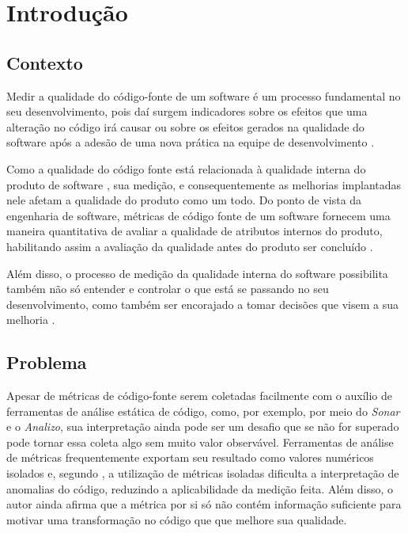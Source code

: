 \chapter{Introdução}

\section{Contexto}

Medir a qualidade do código-fonte  de um software é um processo fundamental no seu desenvolvimento, pois daí surgem indicadores sobre os efeitos que uma alteração no código irá causar ou sobre os efeitos gerados na qualidade do software após a adesão de uma nova prática na equipe de desenvolvimento \cite{Fenton98}. 

Como a qualidade do código fonte está relacionada à qualidade interna do produto de software \cite{ISO25023}, sua medição, e consequentemente as melhorias implantadas nele afetam a qualidade do produto como um todo. Do ponto de vista da engenharia de software, métricas de código fonte de um software fornecem uma maneira quantitativa de avaliar a qualidade de atributos internos do produto, habilitando assim a avaliação da qualidade antes do produto ser concluído \cite{pressman_engenharia_2010}.

Além disso, o processo de medição da qualidade interna do software possibilita também não só entender e controlar o que está se passando no seu desenvolvimento, como também ser encorajado a tomar decisões que visem a sua melhoria \cite{Fenton98}.
 
\section{Problema}
\label{intro_problema}

Apesar de métricas de código-fonte serem coletadas facilmente com o auxílio de ferramentas de análise estática de código, como, por exemplo, por meio do \textit{Sonar} e o \textit{Analizo}, sua interpretação ainda pode ser um desafio que se não for superado pode tornar essa coleta algo sem muito valor observável. Ferramentas de análise de métricas frequentemente exportam seu resultado como valores numéricos isolados \cite{Meirelles2013} e, segundo , a utilização de métricas isoladas dificulta a interpretação de anomalias do código, reduzindo a aplicabilidade da medição feita. Além disso, o autor ainda afirma que a métrica por si só não contém informação suficiente para motivar uma transformação no código que que melhore sua qualidade. 

